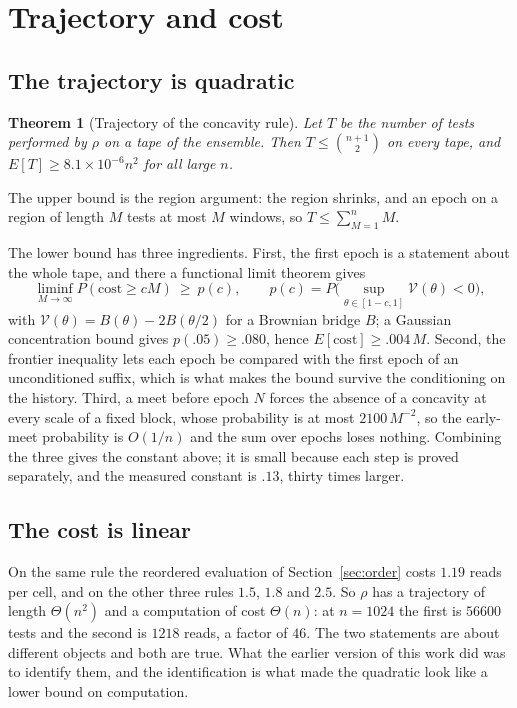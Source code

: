 \documentclass[11pt]{article}
\newtheorem{theorem}{Theorem}
\begin{document}
\section{Trajectory and cost}\label{sec:trajectory}

\subsection{The trajectory is quadratic}

\begin{theorem}[Trajectory of the concavity rule]\label{thm:trajectory}
Let $T$ be the number of tests performed by $\rho$ on a tape of the ensemble. Then
$T\le\binom{n+1}{2}$ on every tape, and $E[T]\ge 8.1\times10^{-6}n^2$ for all large $n$.
\end{theorem}

The upper bound is the region argument: the region shrinks, and an epoch on a region of
length $M$ tests at most $M$ windows, so $T\le\sum_{M=1}^{n}M$.

The lower bound has three ingredients. First, the first epoch is a statement about the whole
tape, and there a functional limit theorem gives
\[
\liminf_{M\to\infty}P(\mathrm{cost}\ge cM)\ \ge\ p(c),\qquad
p(c)=P\Big(\sup_{\theta\in[1-c,1]}\mathcal V(\theta)<0\Big),
\]
with $\mathcal V(\theta)=B(\theta)-2B(\theta/2)$ for a Brownian bridge $B$; a Gaussian
concentration bound gives $p(.05)\ge.080$, hence $E[\mathrm{cost}]\ge.004\,M$. Second, the
frontier inequality lets each epoch be compared with the first epoch of an unconditioned
suffix, which is what makes the bound survive the conditioning on the history. Third, a meet
before epoch $N$ forces the absence of a concavity at every scale of a fixed block, whose
probability is at most $2100\,M^{-2}$, so the early-meet probability is $O(1/n)$ and the sum
over epochs loses nothing. Combining the three gives the constant above; it is small because
each step is proved separately, and the measured constant is $.13$, thirty times larger.

\subsection{The cost is linear}

On the same rule the reordered evaluation of Section~\ref{sec:order} costs $1.19$ reads per
cell, and on the other three rules $1.5$, $1.8$ and $2.5$. So $\rho$ has a trajectory of
length $\Theta(n^2)$ and a computation of cost $\Theta(n)$: at $n=1024$ the first is
$56600$ tests and the second is $1218$ reads, a factor of $46$. The two statements are about
different objects and both are true. What the earlier version of this work did was to
identify them, and the identification is what made the quadratic look like a lower bound on
computation.
\end{document}
